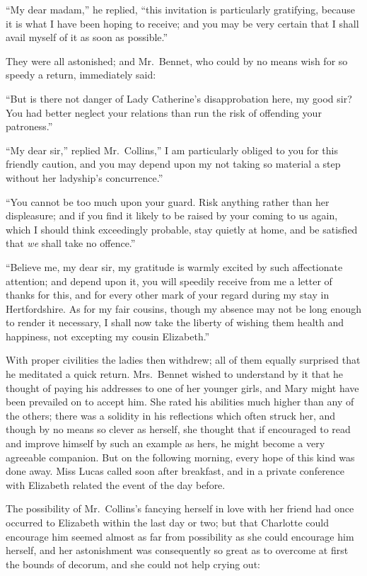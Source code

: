 \documentclass[12pt,english]{book}
\begin{document}
{}``My dear madam,'' he replied, {}``this invitation is particularly
gratifying, because it is what I have been hoping to receive; and
you may be very certain that I shall avail myself of it as soon as
possible.''

They were all astonished; and Mr.\ Bennet, who could by no means
wish for so speedy a return, immediately said:

{}``But is there not danger of Lady Catherine's disapprobation here,
my good sir? You had better neglect your relations than run the risk
of offending your patroness.''

{}``My dear sir,'' replied Mr.\ Collins,'' I am particularly obliged
to you for this friendly caution, and you may depend upon my not taking
so material a step without her ladyship's concurrence.''

{}``You cannot be too much upon your guard. Risk anything rather
than her displeasure; and if you find it likely to be raised by your
coming to us again, which I should think exceedingly probable, stay
quietly at home, and be satisfied that \textit{we} shall take no offence.''

{}``Believe me, my dear sir, my gratitude is warmly excited by such
affectionate attention; and depend upon it, you will speedily receive
from me a letter of thanks for this, and for every other mark of your
regard during my stay in Hertfordshire. As for my fair cousins, though
my absence may not be long enough to render it necessary, I shall
now take the liberty of wishing them health and happiness, not excepting
my cousin Elizabeth.''

With proper civilities the ladies then withdrew; all of them equally
surprised that he meditated a quick return. Mrs.\ Bennet wished to
understand by it that he thought of paying his addresses to one of
her younger girls, and Mary might have been prevailed on to accept
him. She rated his abilities much higher than any of the others; there
was a solidity in his reflections which often struck her, and though
by no means so clever as herself, she thought that if encouraged to
read and improve himself by such an example as hers, he might become
a very agreeable companion. But on the following morning, every hope
of this kind was done away. Miss Lucas called soon after breakfast,
and in a private conference with Elizabeth related the event of the
day before.

The possibility of Mr.\ Collins's fancying herself in love with her
friend had once occurred to Elizabeth within the last day or two;
but that Charlotte could encourage him seemed almost as far from possibility
as she could encourage him herself, and her astonishment was consequently
so great as to overcome at first the bounds of decorum, and she could
not help crying out:
\end{document}

